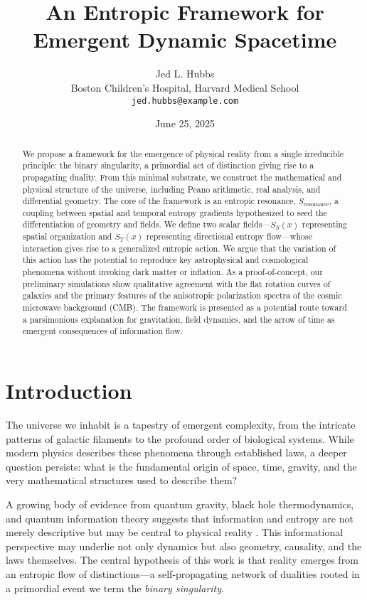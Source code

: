 \documentclass[12pt, a4paper]{article}
\title{An Entropic Framework for Emergent Dynamic Spacetime}
\author{Jed L. Hubbs \\
\small Boston Children’s Hospital, Harvard Medical School \\
\small \texttt{jed.hubbs@example.com}}
\date{June 25, 2025}
\begin{document}
\maketitle

\begin{abstract}
We propose a framework for the emergence of physical reality from a single irreducible principle: the binary singularity, a primordial act of distinction giving rise to a propagating duality. From this minimal substrate, we construct the mathematical and physical structure of the universe, including Peano arithmetic, real analysis, and differential geometry. The core of the framework is an entropic resonance, \(S_{\mathrm{resonance}}\), a coupling between spatial and temporal entropy gradients hypothesized to seed the differentiation of geometry and fields. We define two scalar fields—\(S_S(x)\) representing spatial organization and \(S_T(x)\) representing directional entropy flow—whose interaction gives rise to a generalized entropic action. We argue that the variation of this action has the potential to reproduce key astrophysical and cosmological phenomena without invoking dark matter or inflation. As a proof-of-concept, our preliminary simulations show qualitative agreement with the flat rotation curves of galaxies and the primary features of the anisotropic polarization spectra of the cosmic microwave background (CMB). The framework is presented as a potential route toward a parsimonious explanation for gravitation, field dynamics, and the arrow of time as emergent consequences of information flow.
\end{abstract}

\tableofcontents
\newpage

\section{Introduction}

The universe we inhabit is a tapestry of emergent complexity, from the intricate patterns of galactic filaments to the profound order of biological systems. While modern physics describes these phenomena through established laws, a deeper question persists: what is the fundamental origin of space, time, gravity, and the very mathematical structures used to describe them?

A growing body of evidence from quantum gravity, black hole thermodynamics, and quantum information theory suggests that information and entropy are not merely descriptive but may be central to physical reality \cite{Bekenstein1973, Hawking1975}. This informational perspective may underlie not only dynamics but also geometry, causality, and the laws themselves. The central hypothesis of this work is that reality emerges from an entropic flow of distinctions—a self-propagating network of dualities rooted in a primordial event we term the \emph{binary singularity}.
\end{document}
